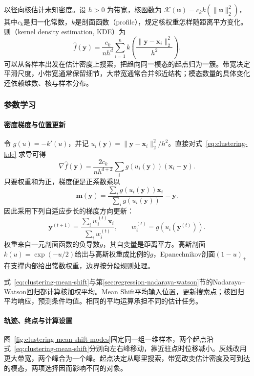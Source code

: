 以径向核估计未知密度。设 $h>0$ 为带宽，核函数为 $\mathcal{K}(\bm{u})=c_k k(\lVert\bm{u}\rVert_2^2)$，其中$c_k$是归一化常数，$k$是剖面函数（profile），规定核权重怎样随距离平方变化。则（kernel density estimation, KDE）为
\begin{equation}
 \hat f(\bm{y})=\frac{c_k}{nh^d}
 \sum_{i=1}^n
 k\left(\frac{\lVert\bm{y}-\bm{x}_i\rVert_2^2}{h^2}\right).
 \label{eq:clustering-kde}
\end{equation}
可以从各样本出发在估计密度上搜索，把趋向同一模态的起点归为一簇。带宽决定平滑尺度，小带宽通常保留细节，大带宽通常合并邻近结构；模态数量的具体变化还依赖维数、核与样本分布。

\subsubsection{参数学习}

\paragraph{密度梯度与位置更新}

令 $g(u)=-k'(u)$，并记 $u_i(\bm{y})=\lVert\bm{y}-\bm{x}_i\rVert_2^2/h^2$。直接对式~\eqref{eq:clustering-kde} 求导可得
\[
 \nabla\hat f(\bm{y})=
 \frac{2c_k}{nh^{d+2}}
 \sum_i g(u_i(\bm{y}))(\bm{x}_i-\bm{y}).
\]
只要权重和为正，梯度便是正系数乘以
\[
 \bm{m}(\bm{y})=
 \frac{\sum_i g(u_i(\bm{y}))\bm{x}_i}
      {\sum_i g(u_i(\bm{y}))}-\bm{y}.
\]
因此采用下列自适应步长的梯度方向更新：
\begin{equation}
 \bm{y}^{(t+1)}=
 \frac{\sum_i w_i^{(t)}\bm{x}_i}{\sum_i w_i^{(t)}},
 \qquad w_i^{(t)}=g(u_i(\bm{y}^{(t)})).
 \label{eq:clustering-mean-shift}
\end{equation}
权重来自一元剖面函数的负导数$g$，其自变量是距离平方。高斯剖面$k(u)=\exp(-u/2)$给出与高斯权重成比例的$g$，Epanechnikov剖面$(1-u)_+$在支撑内部给出常数权重，边界按分段规则处理。

式~\eqref{eq:clustering-mean-shift}与第\ref{sec:regression-nadaraya-watson}节的Nadaraya--Watson回归都计算核加权平均。Mean Shift平均输入位置，更新搜索点；核回归平均响应，预测条件均值。相同的平均运算承担不同的估计任务。

\paragraph{轨迹、终点与计算设置}

图~\ref{fig:clustering-mean-shift-modes}固定同一组一维样本，两个起点沿式~\eqref{eq:clustering-mean-shift}分别向左右峰移动，靠近驻点时位移减小。灰线改用更大带宽，两个峰合为一个峰。起点决定从哪里搜索，带宽改变估计密度及可到达的模态，两项选择因而影响不同的对象。

